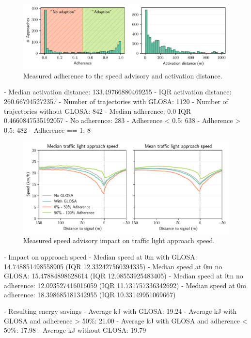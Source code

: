 \begin{figure}[t]
\caption{Measured adherence to the speed advisory and activation distance.}\label{fig:impacts-adherence-activation-distance}
\includegraphics[width=\linewidth]{images/impacts-adherence-activation-distance.pdf}
\end{figure}

- Median activation distance: 133.49766880469255 
- IQR activation distance: 260.667945272357
- Number of trajectories with GLOSA: 1120 
- Number of trajectories without GLOSA: 842
- Median adherence: 0.0 IQR 0.4660847535192057
- No adherence: 283 
- Adherence < 0.5: 638 
- Adherence > 0.5: 482 
- Adherence == 1: 8

\begin{figure}[t]
\caption{Measured speed advisory impact on traffic light approach speed.}\label{fig:impacts-approach-speed}
\includegraphics[width=\linewidth]{images/impacts-approach-speed.pdf}
\end{figure}

- Impact on approach speed
- Median speed at 0m with GLOSA: 14.748851498558905 (IQR 12.332427560394335)
- Median speed at 0m no GLOSA: 15.47884898628614 (IQR 12.08553925483405)
- Median speed at 0m no adherence: 12.093527416016059 (IQR 11.731757336342692)
- Median speed at 0m adherence: 18.398685181342955 (IQR 10.33149951069667)

- Resulting energy savings
- Average kJ with GLOSA: 19.24 
- Average kJ with GLOSA and adherence > 50\%: 21.00 
- Average kJ with GLOSA and adherence < 50\%: 17.98 
- Average kJ without GLOSA: 19.79

